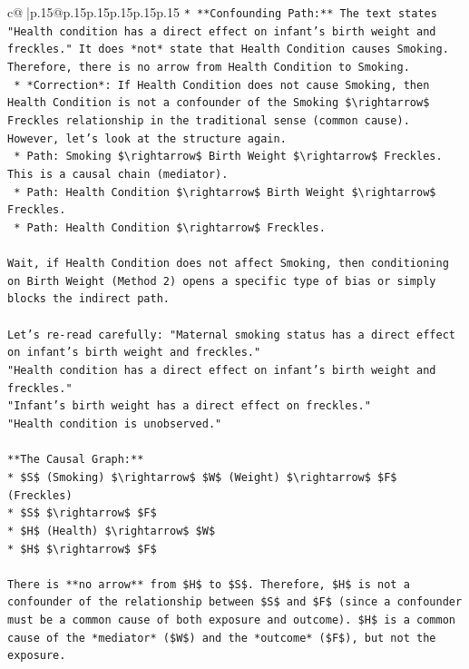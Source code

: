 \documentclass{article}
\begin{document}
{\begin{supertabular}{c@{$\;$}|p{.15\linewidth}@{}p{.15\linewidth}p{.15\linewidth}p{.15\linewidth}p{.15\linewidth}p{.15\linewidth}}
{{{\texttt{*   **Confounding Path:** The text states "Health condition has a direct effect on infant's birth weight and freckles." It does *not* state that Health Condition causes Smoking. Therefore, there is no arrow from Health Condition to Smoking.} \\
\texttt{    *   *Correction*: If Health Condition does not cause Smoking, then Health Condition is not a confounder of the Smoking \$\textbackslash{}rightarrow\$ Freckles relationship in the traditional sense (common cause). However, let's look at the structure again.} \\
\texttt{    *   Path: Smoking \$\textbackslash{}rightarrow\$ Birth Weight \$\textbackslash{}rightarrow\$ Freckles. This is a causal chain (mediator).} \\
\texttt{    *   Path: Health Condition \$\textbackslash{}rightarrow\$ Birth Weight \$\textbackslash{}rightarrow\$ Freckles.} \\
\texttt{    *   Path: Health Condition \$\textbackslash{}rightarrow\$ Freckles.} \\
\\ 
\texttt{Wait, if Health Condition does not affect Smoking, then conditioning on Birth Weight (Method 2) opens a specific type of bias or simply blocks the indirect path.} \\
\\ 
\texttt{Let's re{-}read carefully: "Maternal smoking status has a direct effect on infant's birth weight and freckles."} \\
\texttt{"Health condition has a direct effect on infant's birth weight and freckles."} \\
\texttt{"Infant's birth weight has a direct effect on freckles."} \\
\texttt{"Health condition is unobserved."} \\
\\ 
\texttt{**The Causal Graph:**} \\
\texttt{*   \$S\$ (Smoking) \$\textbackslash{}rightarrow\$ \$W\$ (Weight) \$\textbackslash{}rightarrow\$ \$F\$ (Freckles)} \\
\texttt{*   \$S\$ \$\textbackslash{}rightarrow\$ \$F\$} \\
\texttt{*   \$H\$ (Health) \$\textbackslash{}rightarrow\$ \$W\$} \\
\texttt{*   \$H\$ \$\textbackslash{}rightarrow\$ \$F\$} \\
\\ 
\texttt{There is **no arrow** from \$H\$ to \$S\$. Therefore, \$H\$ is not a confounder of the relationship between \$S\$ and \$F\$ (since a confounder must be a common cause of both exposure and outcome). \$H\$ is a common cause of the *mediator* (\$W\$) and the *outcome* (\$F\$), but not the exposure.} \\
}}}
\end{supertabular}}
\end{document}
